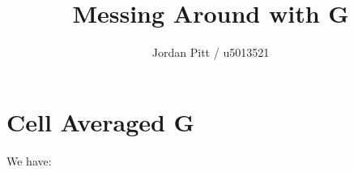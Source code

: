 \documentclass[12pt]{article}
\begin{document}
\title{Messing Around with G}
\author{Jordan Pitt / u5013521}

\section{Cell Averaged G}
We have:
\end{document}
